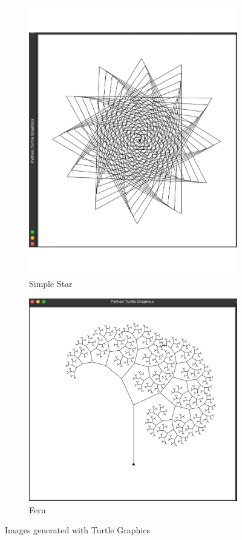\documentclass[12pt,twoside]{reedthesis}
\begin{document}
	\begin{figure}[h]
	\begin{subfigure}{0.5\textwidth}
		\centering
		\includegraphics[clip=true, viewport=0.7in 2in 8in 9in, height = 0.7\textwidth]{Images/TurtleGraphics2}
		\caption{Simple Star}
		\label {TurtleGraphics2}
	\end{subfigure}%
	\begin{subfigure}{0.5\textwidth}
		\centering
		\includegraphics[clip=true, viewport=1.5in 1.3in 9.3in 8.7in, height = 0.7\textwidth]{Images/TurtleGraphics3}
		\caption{Fern}
		\label {TurtleGraphics3}
	\end{subfigure}
	\caption{Images generated with Turtle Graphics}
	\label{TurtleGraphics2and3}
	\end{figure}
	
\end{document}
